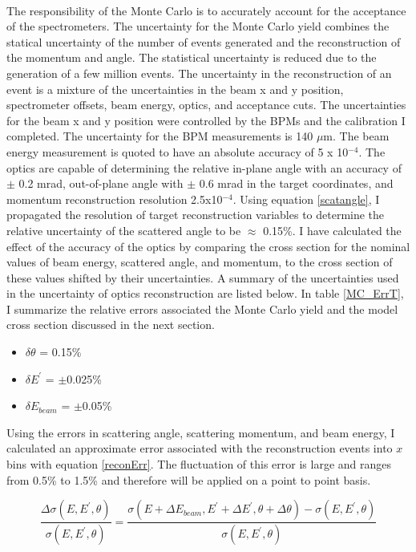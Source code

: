 \paragraph{}The responsibility of the Monte Carlo is to accurately account for the acceptance of the spectrometers. The uncertainty for the Monte Carlo yield combines the statical uncertainty of the number of events generated and the reconstruction of the momentum and angle.  The statistical uncertainty is reduced due to the generation of a few million events. The uncertainty in the reconstruction of an event is a mixture of the uncertainties in the beam x and y position, spectrometer offsets, beam energy, optics, and acceptance cuts. The uncertainties for the beam x and y position were controlled by the BPMs and the calibration I completed. The uncertainty for the BPM measurements is 140 $\mu$m. The beam energy measurement is quoted to have an absolute accuracy of 5 x 10$^{-4}$.  The optics are capable of determining the relative in-plane angle with an accuracy of $\pm$ 0.2 mrad, out-of-plane angle with $\pm$ 0.6 mrad in the target coordinates, and momentum reconstruction resolution 2.5x10$^{-4}$\cite{HallA}.  Using equation \ref{scatangle}, I propagated the resolution of target reconstruction variables to determine the relative uncertainty of the scattered angle to be $\approx$ 0.15\%. I have calculated the effect of the accuracy of the optics by comparing the cross section for the nominal values of beam energy, scattered angle, and momentum, to the cross section of these values shifted by their uncertainties. A summary of the uncertainties used in the uncertainty of optics reconstruction are listed below. In table \ref{MC_ErrT}, I summarize the relative errors associated the Monte Carlo yield and the model cross section discussed in the next section. 
\begin{itemize}
\item$\delta \theta$ = 0.15\%
\item$\delta E^{\prime}$ = $\pm$0.025\%
\item$\delta E_{beam}$ = $\pm$0.05\%
\end{itemize}
Using the errors in scattering angle, scattering momentum, and beam energy, I calculated an approximate error associated with the reconstruction events into $x$ bins with equation \ref{reconErr}. The fluctuation of this error is large and ranges from 0.5\% to 1.5\% and therefore will be applied on a point to point basis. 

\begin{equation}
\frac{\Delta \sigma(E,E^{\prime},\theta)}{ \sigma(E,E^{\prime},\theta)} = \frac{\sigma(E+\Delta E_{beam},E^{\prime}+\Delta E^{\prime},\theta+\Delta \theta) - \sigma(E,E^{\prime},\theta)}{\sigma(E,E^{\prime},\theta)} \label{reconErr}
\end{equation}

